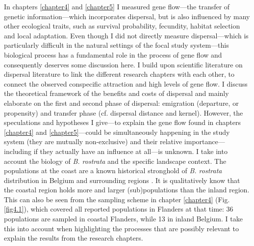 \documentclass[10pt, twoside]{book} %
\begin{document}
	In chapters \ref{chapter4} and \ref{chapter5} I measured gene flow---the transfer of genetic information---which incorporates dispersal, but is also influenced by many other ecological traits, such as survival probability, fecundity, habitat selection and local adaptation. Even though I did not directly measure dispersal---which is particularly difficult in the natural settings of the focal study system---this biological process has a fundamental role in the process of gene flow and consequently deserves some discussion here. I build upon scientific literature on dispersal literature to link the different research chapters with each other, to connect the observed conspecific attraction and high levels of gene flow. I discuss the theoretical framework of the benefits and costs of dispersal and mainly elaborate on the first and second phase of dispersal: emigration (departure, or propensity) and transfer phase (cf. dispersal distance and kernel). However, the speculations and hypotheses I give---to explain the gene flow found in chapters \ref{chapter4} and \ref{chapter5}---could be simultaneously happening in the study system (they are mutually non-exclusive) and their relative importance---including if they actually have an influence at all---is unknown. I take into account the biology of \textit{B. rostrata} and the specific landscape context. The populations at the coast are a known historical stronghold of \textit{B. rostrata} distribution in Belgium and surrounding regions \citep[www.observations.be;][]{klein2004}. It is qualitatively know that the coastal region holds more and larger (sub)populations than the inland region. This can also be seen from the sampling scheme in chapter \ref{chapter4} (Fig. \ref{fig4.1}), which covered all reported populations in Flanders at that time: 36 populations are sampled in coastal Flanders, while 13 in inland Belgium. I take this into account when highlighting the processes that are possibly relevant to explain the results from the research chapters.\\
	
\end{document}

